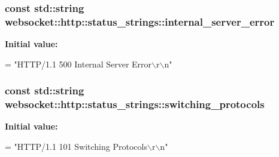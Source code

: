 \subsubsection[{\texorpdfstring{internal\+\_\+server\+\_\+error}{internal_server_error}}]{\setlength{\rightskip}{0pt plus 5cm}const std\+::string websocket\+::http\+::status\+\_\+strings\+::internal\+\_\+server\+\_\+error}\hypertarget{namespacewebsocket_1_1http_1_1status__strings_a364b430d5e52bc7600da0bcc5dc0d5fc}{}\label{namespacewebsocket_1_1http_1_1status__strings_a364b430d5e52bc7600da0bcc5dc0d5fc}
{\bfseries Initial value\+:}
\begin{DoxyCode}
=
                \textcolor{stringliteral}{"HTTP/1.1 500 Internal Server Error\(\backslash\)r\(\backslash\)n"}
\end{DoxyCode}
\subsubsection[{\texorpdfstring{switching\+\_\+protocols}{switching_protocols}}]{\setlength{\rightskip}{0pt plus 5cm}const std\+::string websocket\+::http\+::status\+\_\+strings\+::switching\+\_\+protocols}\hypertarget{namespacewebsocket_1_1http_1_1status__strings_a9b60f1719697fb464b7063cb436e1d75}{}\label{namespacewebsocket_1_1http_1_1status__strings_a9b60f1719697fb464b7063cb436e1d75}
{\bfseries Initial value\+:}
\begin{DoxyCode}
=
                \textcolor{stringliteral}{"HTTP/1.1 101 Switching Protocols\(\backslash\)r\(\backslash\)n"}
\end{DoxyCode}
